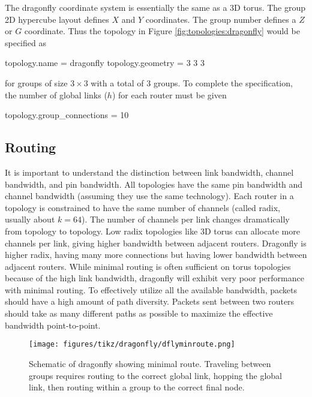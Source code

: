 The dragonfly coordinate system is essentially the same as a 3D torus.  
The group 2D hypercube layout defines $X$ and $Y$ coordinates.
The group number defines a $Z$ or $G$ coordinate.
Thus the topology in Figure \ref{fig:topologies:dragonfly} would be specified as

\begin{ViFile}
topology.name = dragonfly
topology.geometry = 3 3 3
\end{ViFile}
for groups of size $3 \times 3$ with a total of 3 groups.
To complete the specification, the number of global links ($h$) for each router must be given
\begin{ViFile}
topology.group_connections = 10
\end{ViFile}

\subsection{Routing}
\label{subsec:dragonfly:routing}

It is important to understand the distinction between link bandwidth, channel bandwidth, and pin bandwidth.
All topologies have the same pin bandwidth and channel bandwidth (assuming they use the same technology).
Each router in a topology is constrained to have the same number of channels (called radix, usually about $k=64$).
The number of channels per link changes dramatically from topology to topology.
Low radix topologies like 3D torus can allocate more channels per link, 
giving higher bandwidth between adjacent routers.
Dragonfly is higher radix, having many more connections but having lower bandwidth between adjacent routers.
While minimal routing is often sufficient on torus topologies because of the high link bandwidth,
dragonfly will exhibit very poor performance with minimal routing.
To effectively utilize all the available bandwidth, packets should have a high amount of path diversity.
Packets sent between two routers should take as many different paths as possible to maximize the effective bandwidth point-to-point.

\begin{figure}[h!]
\centering
\texttt{[image: figures/tikz/dragonfly/dflyminroute.png]}
\caption{Schematic of dragonfly showing minimal route. Traveling between groups requires routing to the correct global link, hopping the global link, then routing within a group to the correct final node.}
\label{fig:topologies:dflyminroute}
\end{figure}

